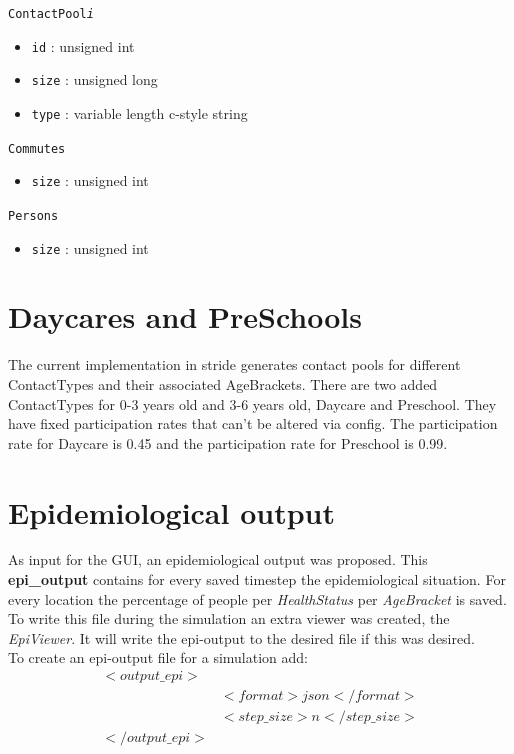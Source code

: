 \texttt{ContactPool\textit{i}}
\begin{itemize}
\item \texttt{id} : unsigned int 
\item \texttt{size} : unsigned long 
\item \texttt{type} : variable length c-style string
\end{itemize}

\texttt{Commutes}
\begin{itemize}
\item \texttt{size} : unsigned int
\end{itemize}

\texttt{Persons}
\begin{itemize}
\item \texttt{size} : unsigned int
\end{itemize}

\section{Daycares and PreSchools}
\label{section:Daycares and PreSchools}
The current implementation in stride generates contact pools for different ContactTypes and their associated AgeBrackets. There are two added ContactTypes for 0-3 years old and 3-6 years old, Daycare and Preschool. They have fixed participation rates that can't be altered via config. The participation rate for Daycare is 0.45 and the participation rate for Preschool is 0.99.


\section{Epidemiological output}
As input for the GUI, an epidemiological output was proposed. This \textbf{epi\_output} contains for every saved timestep the epidemiological situation. For every location the percentage of people per \textit{HealthStatus} per \textit{AgeBracket} is saved. To write this file during the simulation an extra viewer was created, the \textit{EpiViewer}. It will write the epi-output to the desired file if this was desired.\\
To create an epi-output file for a simulation add:
\begin{equation}
\begin{split}
<output\_epi>&	\\
			&<format>json</format>\\
			&<step\_size>n</step\_size>\\
</output\_epi>&
\end{split}
\end{equation}

